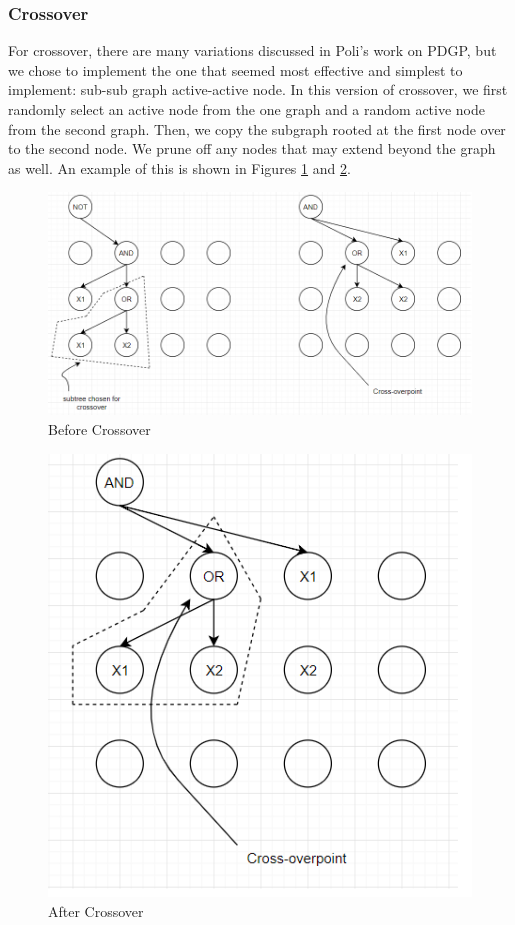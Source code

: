 \documentclass{article}
\begin{document}
	\subsubsection{Crossover}
	For crossover, there are many variations discussed in Poli's work on PDGP, but we chose to implement the one that seemed most effective and simplest to implement: sub-sub graph active-active node. In this version of crossover, we first randomly select an active node from the one graph and a random active node from the second graph. Then, we copy the subgraph rooted at the first node over to the second node. We prune off any nodes that may extend beyond the graph as well. An example of this is shown in Figures \ref{sample2} and \ref{sample3}.
	\begin{figure}[h!]
		\centering
		\includegraphics[width=\textwidth]{sample2.png}
		\caption{Before Crossover}
		\label{sample2}
	\end{figure}
	\begin{figure}[h!]
	\centering
	\includegraphics[scale=1]{sample3.png}
	\caption{After Crossover}
	\label{sample3}
\end{figure}
	
\end{document}
